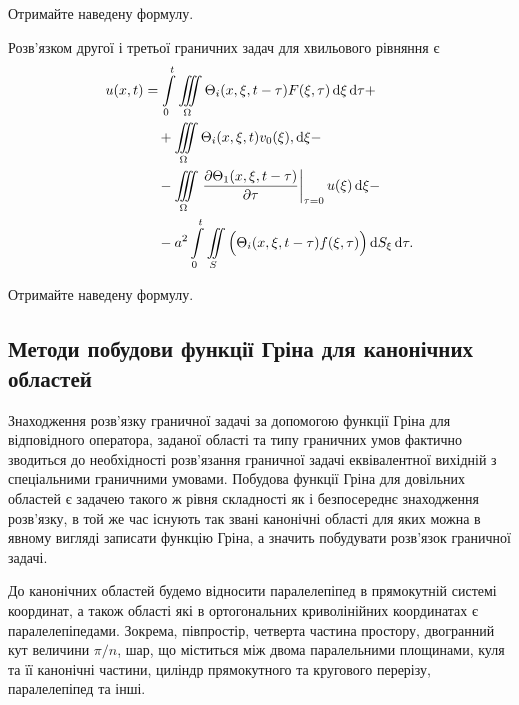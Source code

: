 \begin{exercise}
	Отримайте наведену формулу.
\end{exercise}

\begin{th_formula}
	Розв'язком другої і третьої граничних задач для хвильового рівняння є 
	\begin{equation}
		\begin{aligned}
			u(x, t) &= \displaystyle\int\limits_0^t \displaystyle\iiint\limits_\Omega \Theta_i(x, \xi, t - \tau) F(\xi, \tau) \mathop{}\!\mathrm{d} \xi \mathop{}\!\mathrm{d} \tau + \\
			& \quad + \displaystyle\iiint\limits_\Omega \Theta_i(x, \xi, t) v_0(\xi), \mathop{}\!\mathrm{d} \xi - \\
			& \quad - \displaystyle\iiint\limits_\Omega \left. \frac{\partial \Theta_1(x, \xi, t - \tau)}{\partial \tau} \right|_{\tau = 0} u(\xi) \mathop{}\!\mathrm{d} \xi - \\
			& \quad - a^2 \displaystyle\int\limits_0^t \displaystyle\iint\limits_S \Big( \Theta_i(x, \xi, t - \tau) f(\xi, \tau) \Big) \mathop{}\!\mathrm{d} S_\xi \mathop{}\!\mathrm{d} \tau.
		\end{aligned}
	\end{equation}
\end{th_formula}

\begin{exercise}
	Отримайте наведену формулу.
\end{exercise}

\subsection{Методи побудови функції Гріна для канонічних областей}

Знаходження розв'язку граничної задачі за допомогою функції Гріна для відповідного оператора, заданої області та типу граничних умов фактично зводиться до необхідності розв'язання граничної задачі еквівалентної вихідній з спеціальними граничними умовами. Побудова функції Гріна для довільних областей є задачею такого ж рівня складності як і безпосереднє знаходження розв'язку, в той же час існують так звані канонічні області для яких можна в явному вигляді записати функцію Гріна, а значить побудувати розв'язок граничної задачі. \medskip

До канонічних областей будемо відносити паралелепіпед в прямокутній системі координат, а також області які в ортогональних криволінійних координатах є паралелепіпедами. Зокрема, півпростір, четверта частина простору, двогранний кут величини $\pi / n$, шар, що міститься між двома паралельними площинами, куля та її канонічні частини, циліндр прямокутного та кругового перерізу, паралелепіпед та інші.

